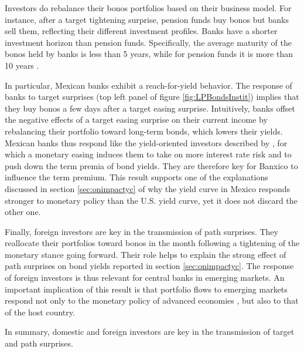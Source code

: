 {Investors do rebalance their bonos portfolios based on their business model.
For instance, after a target tightening surprise, pension funds buy bonos but banks sell them, reflecting their different investment profiles. 
Banks have a shorter investment horizon than pension funds. 
Specifically, the average maturity of the bonos held by banks is less than 5 years, while for pension funds it is more than 10 years \parencite{Banxico:2014}. 

In particular, Mexican banks exhibit a reach-for-yield behavior. 
The response of banks to target surprises (top left panel of figure \ref{fig:LPBondsInstit}) implies that they buy bonos a few days after a target easing surprise. Intuitively, banks offset the negative effects of a target easing surprise on their current income by rebalancing their portfolio toward long-term bonds, which lowers their yields. 
Mexican banks thus respond like the yield-oriented investors described by \textcite{HansonStein:2015}, for which a monetary easing induces them to take on more interest rate risk and to push down the term premia of bond yields. 
They are therefore key for Banxico to influence the term premium. 
This result supports one of the explanations discussed in section \ref{sec:onimpactyc} of why the yield curve in Mexico responds stronger to monetary policy than the U.S. yield curve, yet it does not discard the other one. 

Finally, foreign investors are key in the transmission of path surprises. 
They reallocate their portfolios toward bonos in the month following a tightening of the monetary stance going forward. 
Their role helps to explain the strong effect of path surprises on bond yields reported in section \ref{sec:onimpactyc}. 
The response of foreign investors is thus relevant for central banks in emerging markets. 
An important implication of this result is that portfolio flows to emerging markets respond not only to the monetary policy of advanced economies \parencite{Chenetal:2014,Curcuruetal:2015,Fischer:2020}, but also to that of the host country. 

In summary, domestic and foreign investors are key in the transmission of target and path surprises.

}{}	%


